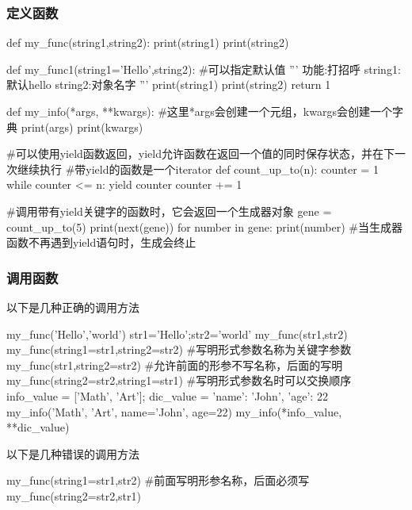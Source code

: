     \subsubsection{定义函数}
      \begin{codeblock}[language=python, caption={definition of functions}]
        def my_func(string1,string2):
          print(string1)
          print(string2)

        def my_func1(string1='Hello',string2): #可以指定默认值
          ''' 功能:打招呼
              string1:默认hello
              string2:对象名字 '''
          print(string1)
          print(string2)
          return 1

        def my_info(*args, **kwargs): #这里*args会创建一个元组，kwargs会创建一个字典
          print(args)
          print(kwargs)

        #可以使用yield函数返回，yield允许函数在返回一个值的同时保存状态，并在下一次继续执行
        #带yield的函数是一个iterator
        def count_up_to(n):
            counter = 1
            while counter <= n:
                yield counter
                counter += 1

        #调用带有yield关键字的函数时，它会返回一个生成器对象
        gene = count_up_to(5)
        print(next(gene))
        for number in gene:
            print(number)
        #当生成器函数不再遇到yield语句时，生成会终止
      \end{codeblock}

    \subsubsection{调用函数}
      以下是几种正确的调用方法
      \begin{codeblock}[language=python, caption={use of function}]
        my_func('Hello','world')
        str1='Hello';str2='world'
        my_func(str1,str2)
        my_func(string1=str1,string2=str2) #写明形式参数名称为关键字参数
        my_func(str1,string2=str2) #允许前面的形参不写名称，后面的写明
        my_func(string2=str2,string1=str1) #写明形式参数名时可以交换顺序
        info_value = ['Math', 'Art']; dic_value = {'name': 'John', 'age': 22}
        my_info('Math', 'Art', name='John', age=22)
        my_info(*info_value, **dic_value)
      \end{codeblock}

      以下是几种错误的调用方法
      \begin{codeblock}[language=python, caption={mistakes in using functions}]
        my_func(string1=str1,str2) #前面写明形参名称，后面必须写
        my_func(string2=str2,str1)
      \end{codeblock}

